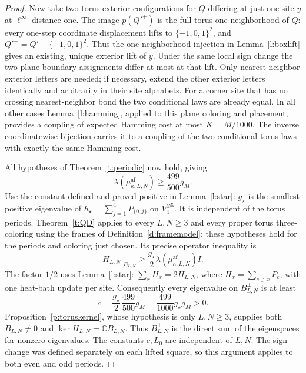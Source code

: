 \begin{proof}
Now take two torus exterior configurations for \(Q\) differing at
just one site \(y\) at \(\ell^\infty\) distance one.
The image \(p(Q'^+)\) is the full torus one-neighborhood of \(Q\):
every one-step coordinate displacement lifts to
\(\{-1,0,1\}^2\), and
\(Q'^+=Q'+\{-1,0,1\}^2\).
Thus the one-neighborhood injection in Lemma~\ref{l:boxlift}
gives an existing, unique exterior lift of \(y\).
Under the same local
sign change the two plane boundary assignments differ at most at
that lift.  Only nearest-neighbor exterior letters are needed; if
necessary, extend the other exterior letters identically and
arbitrarily in their site alphabets.  For a corner site that has no
crossing nearest-neighbor bond the two conditional laws are already
equal.  In all other cases Lemma~\ref{l:hamming}, applied to this
plane coloring and placement, provides a coupling of expected
Hamming cost at most \(K=M/1000\).  The inverse coordinatewise
bijection carries it to a coupling of the two conditional torus laws
with exactly the same Hamming cost.

All hypotheses of Theorem~\ref{t:periodic} now hold, giving
\[
 \lambda(\mu^{\mathrm{af}}_{\kappa,L,N})
                        \ge\frac{499}{500}g_M.
\]
Use the constant defined and proved positive in Lemma~\ref{l:star}:
\(g_\star\) is the smallest positive eigenvalue of
\(h_\star=\sum_{j=1}^4P_{\{0,j\}}\) on \(V_4^{\otimes5}\).
It is independent of the torus periods.  Theorem~\ref{t:QD} applies
to every \(L,N\ge3\) and every proper torus three-coloring using
the frames of Definition~\ref{d:framemodel}; these hypotheses hold
for the periods and coloring just chosen.  Its precise operator
inequality is
\[
 H_{L,N}\big|_{B_{L,N}^{\perp}}
       \ge\frac{g_\star}{2}
               \lambda(\mu^{\mathrm{af}}_{\kappa,L,N})I.
\]
The factor \(1/2\) uses Lemma~\ref{l:star}:
\(\sum_xH_x=2H_{L,N}\), where \(H_x=\sum_{e\ni x}P_e\),
with one heat-bath update per site.  Consequently every eigenvalue on
\(B_{L,N}^{\perp}\) is at least
\[
 c=\frac{g_\star}{2}\,\frac{499}{500}g_M
                         =\frac{499}{1000}g_\star g_M>0.
\]
Proposition~\ref{p:toruskernel}, whose hypothesis is only
\(L,N\ge3\), supplies both \(B_{L,N}\ne0\) and
\(\ker H_{L,N}=\mathbb C B_{L,N}\).  Thus \(B_{L,N}^{\perp}\)
is the direct sum of the eigenspaces for nonzero eigenvalues.
The constants \(c,L_0\) are independent of \(L,N\).
The sign change was defined separately on each lifted square, so this
argument applies to both even and odd periods.
\end{proof}


